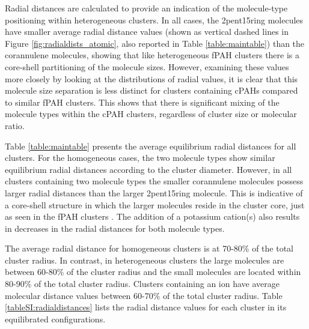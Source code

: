Radial distances are calculated to provide an indication of the molecule-type positioning within heterogeneous clusters. In all cases, the 2pent15ring molecules have smaller average radial distance values (shown as vertical dashed lines in Figure \ref{fig:radialdists_atomic}, also reported in Table \ref{table:maintable}) than the corannulene molecules, showing that like heterogeneous fPAH clusters \cite{bowal2018partitioning} there is a core-shell partitioning of the molecule sizes. 
However, examining these values more closely by looking at the distributions of radial values, it is clear that this molecule size separation is less distinct for clusters containing cPAHs compared to similar fPAH clusters. This shows that there is significant mixing of the molecule types within the cPAH clusters, regardless of cluster size or molecular ratio.

Table \ref{table:maintable} presents the average equilibrium radial distances for all clusters. For the homogeneous cases, the two molecule types show similar equilibrium radial distances according to the cluster diameter. However, in all clusters containing two molecule types the smaller corannulene molecules possess larger radial distances than the larger 2pent15ring molecule. This is indicative of a core-shell structure in which the larger molecules reside in the cluster core, just as seen in the fPAH clusters \cite{bowal2018partitioning}.
The addition of a potassium cation(s) also results in decreases in the radial distances for both molecule types.

The average radial distance for homogeneous clusters is at 70-80\% of the total cluster radius. In contrast, in heterogeneous clusters the large molecules are between 60-80\% of the cluster radius and the small molecules are located within 80-90\% of the total cluster radius.  Clusters containing an ion have average molecular distance values between 60-70\% of the total cluster radius. %
Table \ref{tableSI:radialdistances} lists the radial distance values for each cluster in its equilibrated configurations.

